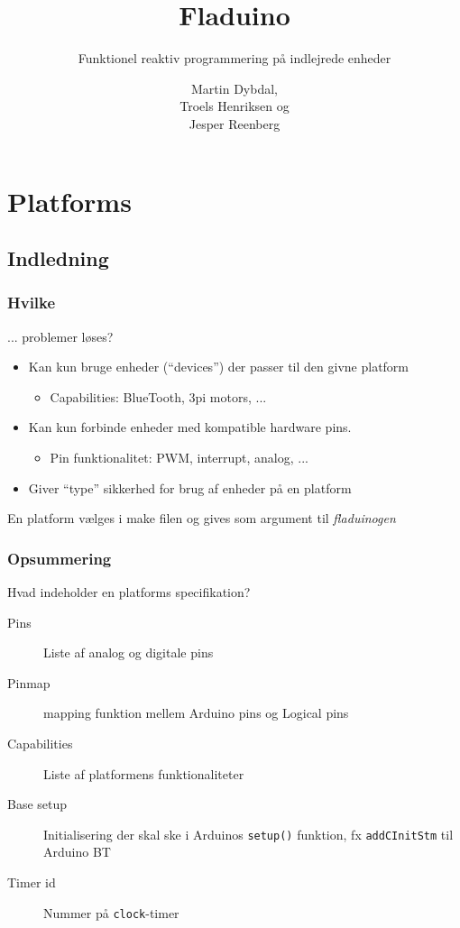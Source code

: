 \documentclass[t]{beamer}
\title{Fladuino}
\subtitle{Funktionel reaktiv programmering på indlejrede enheder}
\author{Martin Dybdal, \\
Troels Henriksen og \\
Jesper Reenberg
}
\begin{document}
\frame{\titlepage}

\section[Outline]{}
\frame{\tableofcontents}


\section{Platforms}

\subsection{Indledning}

\begin{frame}
  \frametitle{Hvilke}
  
  ... problemer løses?

  \begin{itemize}
  \item Kan kun bruge enheder ("`devices"') der passer til den givne platform
    \begin{itemize}
    \item Capabilities: BlueTooth, 3pi motors, ...
    \end{itemize}
  \item Kan kun forbinde enheder med kompatible hardware pins.
    \begin{itemize}
    \item Pin funktionalitet: PWM, interrupt, analog, ...
    \end{itemize}
  \item Giver "`type"' sikkerhed for brug af enheder på en platform
  \end{itemize}  

  En platform vælges i make filen og gives som argument til \textit{fladuinogen}

\end{frame}


\begin{frame}
  \frametitle{Opsummering}

  Hvad indeholder en platforms specifikation?
  \begin{description}
  \item [Pins] Liste af analog og digitale pins
  \item [Pinmap] mapping funktion mellem Arduino pins og Logical pins
  \item [Capabilities] Liste af platformens funktionaliteter 
  \item [Base setup] Initialisering der skal ske i Arduinos \texttt{setup()}
    funktion, fx \texttt{addCInitStm} til Arduino BT
  \item [Timer id] Nummer på \texttt{clock}-timer
  \end{description}
\end{frame}
\end{document}
